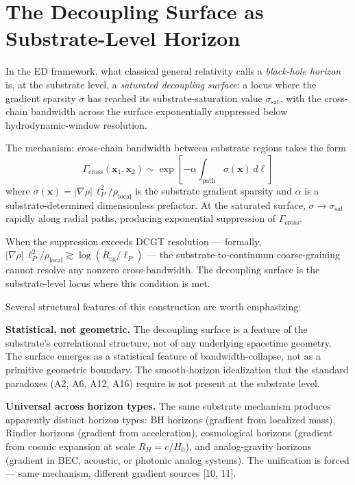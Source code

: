 \documentclass[11pt,a4paper]{article}
\begin{document}
\section{The Decoupling Surface as Substrate-Level Horizon}

In the ED framework, what classical general relativity calls a \emph{black-hole horizon} is, at the substrate level, a \emph{saturated decoupling surface}: a locus where the gradient sparsity $\sigma$ has reached its substrate-saturation value $\sigma_{\mathrm{sat}}$, with the cross-chain bandwidth across the surface exponentially suppressed below hydrodynamic-window resolution.

The mechanism: cross-chain bandwidth between substrate regions takes the form
\[
\Gamma_{\mathrm{cross}}(\mathbf{x}_1, \mathbf{x}_2) \sim \exp\left[-\alpha \int_{\mathrm{path}} \sigma(\mathbf{x})\, d\ell\right]
\]
where $\sigma(\mathbf{x}) = |\nabla\rho|\, \ell_P^2 / \rho_{\mathrm{local}}$ is the substrate gradient sparsity and $\alpha$ is a substrate-determined dimensionless prefactor. At the saturated surface, $\sigma \to \sigma_{\mathrm{sat}}$ rapidly along radial paths, producing exponential suppression of $\Gamma_{\mathrm{cross}}$.

When the suppression exceeds DCGT resolution --- formally, $|\nabla\rho|\, \ell_P^2 / \rho_{\mathrm{local}} \gtrsim \log(R_{\mathrm{cg}}/\ell_P)$ --- the substrate-to-continuum coarse-graining cannot resolve any nonzero cross-bandwidth. The decoupling surface is the substrate-level locus where this condition is met.

Several structural features of this construction are worth emphasizing:

\textbf{Statistical, not geometric.} The decoupling surface is a feature of the substrate's correlational structure, not of any underlying spacetime geometry. The surface emerges as a statistical feature of bandwidth-collapse, not as a primitive geometric boundary. The smooth-horizon idealization that the standard paradoxes (A2, A6, A12, A16) require is not present at the substrate level.

\textbf{Universal across horizon types.} The same substrate mechanism produces apparently distinct horizon types: BH horizons (gradient from localized mass), Rindler horizons (gradient from acceleration), cosmological horizons (gradient from cosmic expansion at scale $R_H = c/H_0$), and analog-gravity horizons (gradient in BEC, acoustic, or photonic analog systems). The unification is forced --- same mechanism, different gradient sources [10, 11].
\end{document}
